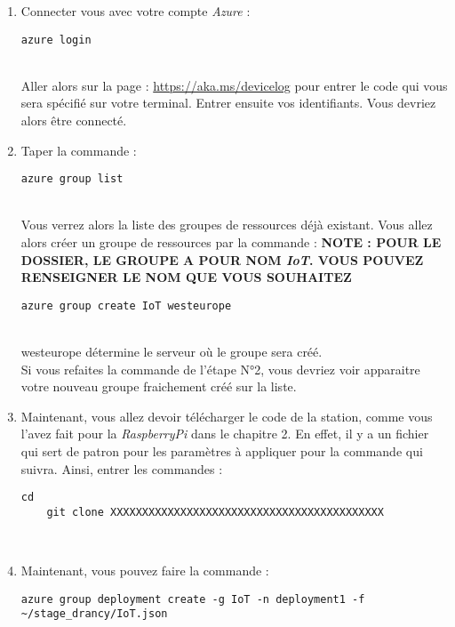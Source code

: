 \begin{enumerate}
	\item Connecter vous avec votre compte \textit{Azure} :
	\begin{lstlisting}[style=MyBashStyle]
	azure login
	\end{lstlisting}\\
	Aller alors sur la page : \href{https://aka.ms/devicelog}{https://aka.ms/devicelog} pour entrer le code qui vous sera spécifié sur votre terminal. Entrer ensuite vos identifiants. Vous devriez alors être connecté. %
	\item Taper la commande :
	\begin{lstlisting}[style=MyBashStyle]
	azure group list
	\end{lstlisting}\\
Vous verrez alors la liste des groupes de ressources déjà existant. Vous allez alors créer un groupe de ressources par la commande : 
	\textbf{NOTE : POUR LE DOSSIER, LE GROUPE A POUR NOM \textit{IoT}. VOUS POUVEZ RENSEIGNER LE NOM QUE VOUS SOUHAITEZ}\\
	\begin{lstlisting}[style=MyBashStyle]
	azure group create IoT westeurope
	\end{lstlisting}\\
westeurope détermine le serveur où le groupe sera créé. %
\\
Si vous refaites la commande de l'étape N°2, vous devriez voir apparaitre votre nouveau groupe fraichement créé sur la liste.
	\item Maintenant, vous allez devoir télécharger le code de la station, comme vous l'avez fait pour la \textit{RaspberryPi} dans le chapitre 2. En effet, il y a un fichier qui sert de patron pour les paramètres à appliquer pour la commande qui suivra. Ainsi, entrer les commandes : 
	\begin{lstlisting}[style=MyBashStyle]
	cd
	git clone XXXXXXXXXXXXXXXXXXXXXXXXXXXXXXXXXXXXXXXXXXX
	\end{lstlisting}\\
	\item Maintenant, vous pouvez faire la commande :
	\begin{lstlisting}[style=MyBashStyle]
azure group deployment create -g IoT -n deployment1 -f ~/stage_drancy/IoT.json
	\end{lstlisting}\\ %


\end{enumerate}
